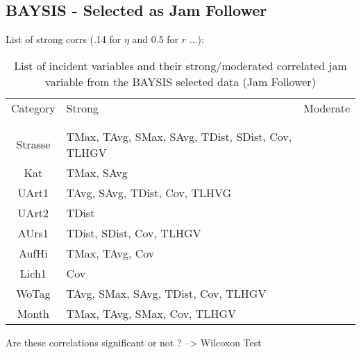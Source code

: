 \subsection{BAYSIS - Selected as Jam Follower}

List of strong corrs (.14 for $\eta$ and 0.5 for $r$ ...):

\noindent
\begin{table}[h!]
	\centering
	\begin{tabular}{c|l|l}  
		Category & Strong & Moderate \\
		\\[-1em]
		\hline
		\\[-1em]
		Strasse & TMax, TAvg, SMax, SAvg, TDist, SDist, Cov, TLHGV & \\ 
 		Kat & TMax, SAvg & \\ 
 		UArt1 & TAvg, SAvg, TDist, Cov, TLHVG & \\
 		UArt2 & TDist & \\
 		AUrs1 & TDist, SDist, Cov, TLHGV & \\
 		AufHi & TMax, TAvg, Cov & \\
 		Lich1 & Cov & \\
 		WoTag & TAvg, SMax, SAvg, TDist, Cov, TLHGV & \\
 		Month & TMax, TAvg, SMax, Cov, TLHGV & \\
	\end{tabular}
	\caption{List of incident variables and their strong/moderated correlated jam variable from the BAYSIS selected data (Jam Follower)}
\end{table}

Are these correlations significant or not ? --> Wilcoxon Test


